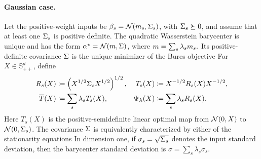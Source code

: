 \paragraph{Gaussian case.}
\begin{prop}\label{prop-gaussian-barycenter}
Let the positive-weight inputs be $\beta_s=\mathcal{N}(m_s,\Sigma_s)$, with $\Sigma_s\succeq0$, and assume that at least one $\Sigma_s$ is positive definite. The quadratic Wasserstein barycenter is unique and has the form $\alpha^\star=\mathcal{N}(m,\Sigma)$, where
\(m=\sum_s\lambda_sm_s.\)
Its positive-definite covariance $\Sigma$ is the unique minimizer of the Bures objective
For $X\in\mathbb S_{++}^d$, define
\begin{align}
R_s(X)
&\coloneqq
\left( X^{1/2}\Sigma_sX^{1/2} \right)^{1/2},
&
T_s(X)
&\coloneqq
X^{-1/2}R_s(X)X^{-1/2},
\label{eq-gaussian-barycenter-maps}
\\
\overline T(X)
&\coloneqq
\sum_s\lambda_sT_s(X),
&
\Psi_{\lambda}(X)
&\coloneqq
\sum_s\lambda_sR_s(X).
\label{eq-gaussian-barycenter-average-map}
\end{align}
Here $T_s(X)$ is the positive-semidefinite linear optimal map from $\mathcal{N}(0,X)$ to $\mathcal{N}(0,\Sigma_s)$. The covariance $\Sigma$ is equivalently characterized by either of the stationarity equations
In dimension one, if $\sigma_s=\sqrt{\Sigma_s}$ denotes the input standard deviation, then the barycenter standard deviation is $\sigma=\sum_s\lambda_s\sigma_s$.
\end{prop}
